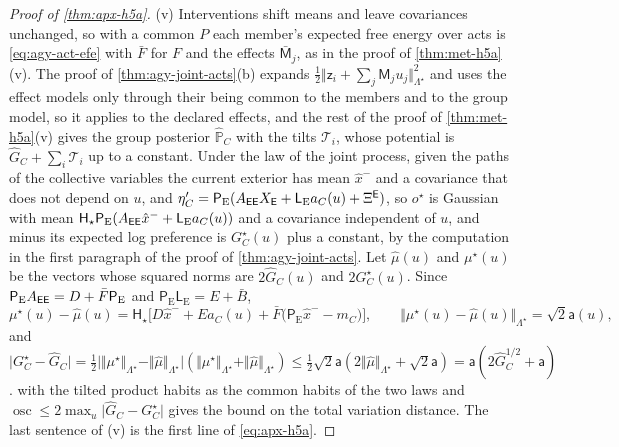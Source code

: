 \begin{proof}[Proof of \cref{thm:apx-h5a}]
(v) Interventions shift means and leave covariances unchanged, so with a common $P$ each member's expected free energy over acts is \eqref{eq:agy-act-efe} with $\bar F$ for $F$ and the effects $\bar{\mathsf M}_j$, as in the proof of \cref{thm:met-h5a}(v). The proof of \cref{thm:agy-joint-acts}(b) expands $\frac12\Vert\mathsf z_i+\sum_j\mathsf M_ju_j\Vert^2_{\Lambda^\star}$ and uses the effect models only through their being common to the members and to the group model, so it applies to the declared effects, and the rest of the proof of \cref{thm:met-h5a}(v) gives the group posterior $\hat{\mathbb P}_C$ with the tilts $\mathcal T_i$, whose potential is $\hat G_C+\sum_i\mathcal T_i$ up to a constant. Under the law of the joint process, given the paths of the collective variables the current exterior has mean $\hat x^-$ and a covariance that does not depend on $u$, and $\eta_C'=\mathsf P_{\mathrm E}(A_{\mathsf{E}\mathsf{E}}X_{\mathsf{E}}+\mathsf L_{\mathrm E}a_C(u)+\Xi^{\mathsf{E}})$, so $o^\star$ is Gaussian with mean $\mathsf H_\star\mathsf P_{\mathrm E}(A_{\mathsf{E}\mathsf{E}}\hat x^-+\mathsf L_{\mathrm E}a_C(u))$ and a covariance independent of $u$, and minus its expected log preference is $G^\star_C(u)$ plus a constant, by the computation in the first paragraph of the proof of \cref{thm:agy-joint-acts}. Let $\hat\mu(u)$ and $\mu^\star(u)$ be the vectors whose squared norms are $2\hat G_C(u)$ and $2G^\star_C(u)$. Since $\mathsf P_{\mathrm E}A_{\mathsf{E}\mathsf{E}}=D+\bar F\mathsf P_{\mathrm E}$ and $\mathsf P_{\mathrm E}\mathsf L_{\mathrm E}=E+\bar B$,
\begin{equation*}
\mu^\star(u)-\hat\mu(u)=\mathsf H_\star\bigl[D\hat x^-+Ea_C(u)+\bar F\bigl(\mathsf P_{\mathrm E}\hat x^--m_C\bigr)\bigr],\qquad\Vert\mu^\star(u)-\hat\mu(u)\Vert_{\Lambda^\star}=\sqrt2\mathsf a(u),
\end{equation*}
and $\lvert G^\star_C-\hat G_C\rvert=\frac12\lvert\Vert\mu^\star\Vert_{\Lambda^\star}-\Vert\hat\mu\Vert_{\Lambda^\star}\rvert(\Vert\mu^\star\Vert_{\Lambda^\star}+\Vert\hat\mu\Vert_{\Lambda^\star})\le\frac12\sqrt2\mathsf a(2\Vert\hat\mu\Vert_{\Lambda^\star}+\sqrt2\mathsf a)=\mathsf a(2\hat G_C^{1/2}+\mathsf a)$.  with the tilted product habits as the common habits of the two laws and $\operatorname{osc}\le2\max_u\lvert\hat G_C-G^\star_C\rvert$ gives the bound on the total variation distance. The last sentence of (v) is the first line of \eqref{eq:apx-h5a}.
\end{proof}

